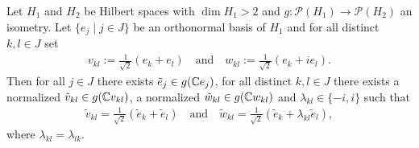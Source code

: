 \begin{lemma} \label{lemma:aux_last}
	Let $H_1$ and $H_2$ be Hilbert spaces with $\dim H_1 >2$ and $g: \mathcal{P}(H_1) \to \mathcal{P}(H_2)$ an isometry. Let $\{e_j \mid j \in J\}$ be an orthonormal basis of $H_1$ and for all distinct $k,l \in J$ set
	\begin{align*}
		v_{kl} := \frac{1}{\sqrt{2}}(e_k + e_l) \quad \text{and} \quad w_{kl} := \frac{1}{\sqrt{2}}(e_k + ie_l).
	\end{align*}
	Then for all $j \in J$ there exists $\tilde{e}_j \in g(\mathbb{C} e_j)$, for all distinct $k,l \in J$ there exists a normalized $\tilde{v}_{kl} \in g(\mathbb{C} v_{kl})$, a normalized $\tilde{w}_{kl} \in g(\mathbb{C} w_{kl})$ and $\lambda_{kl} \in \{-i, i\}$ such that 
	\begin{align*}
		\tilde{v}_{kl} = \frac{1}{\sqrt{2}}(\tilde{e}_k + \tilde{e}_l) \quad \text{and} \quad \tilde{w}_{kl} = \frac{1}{\sqrt{2}}(\tilde{e}_k + \lambda_{kl} \tilde{e}_l),
	\end{align*}
	where $\lambda_{kl} = \lambda_{lk}$.
\end{lemma}

